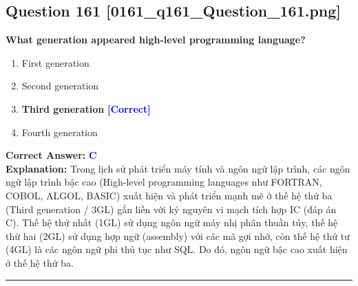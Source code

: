 \documentclass[11pt,a4paper]{article}
\begin{document}
\begin{minipage}{\textwidth}
\subsection*{Question 161 \quad \footnotesize{[0161\_q161\_Question\_161.png]}}
\noindent \textbf{What generation appeared high-level programming language?}

\begin{enumerate}[label=\Alph*.]
    \item First generation
    \item Second generation
    \item \textbf{Third generation} \hfill \textcolor{blue}{\textbf{[Correct]}}
    \item Fourth generation
\end{enumerate}

\noindent \textbf{Correct Answer:} \textcolor{blue}{\textbf{C}} \\[2pt]
\noindent \textbf{Explanation:} Trong lịch sử phát triển máy tính và ngôn ngữ lập trình, các ngôn ngữ lập trình bậc cao (High-level programming languages như FORTRAN, COBOL, ALGOL, BASIC) xuất hiện và phát triển mạnh mẽ ở thế hệ thứ ba (Third generation / 3GL) gắn liền với kỷ nguyên vi mạch tích hợp IC (đáp án C). Thế hệ thứ nhất (1GL) sử dụng ngôn ngữ máy nhị phân thuần túy, thế hệ thứ hai (2GL) sử dụng hợp ngữ (assembly) với các mã gợi nhớ, còn thế hệ thứ tư (4GL) là các ngôn ngữ phi thủ tục như SQL. Do đó, ngôn ngữ bậc cao xuất hiện ở thế hệ thứ ba.

\par\vspace{0.3cm}
\hrule
\vspace{0.3cm}
\end{minipage}
\end{document}
